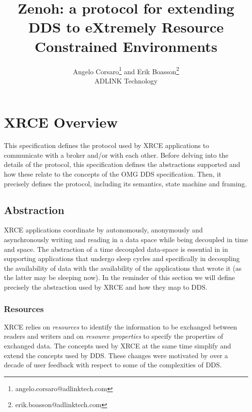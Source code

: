 \documentclass[a4paper,oneside,article]{memoir}
\begin{document}
\title{Zenoh: a protocol for extending DDS to eXtremely Resource Constrained Environments}
\author{Angelo Corsaro\thanks{angelo.corsaro@adlinktech.com} and Erik Boasson\thanks{erik.boasson@adlinktech.com} \\ ADLINK Technology}

\maketitle

\chapter{XRCE Overview}

This specification defines the protocol used by XRCE applications to communicate with a broker
and/or with each other.  Before delving into the details of the protocol, this specification defines
the abstractions supported and how these relate to the concepts of the OMG DDS specification.  Then,
it precisely defines the protocol, including its semantics, state machine and framing.

\section{Abstraction}

XRCE applications coordinate by autonomously, anonymously and asynchronously writing and reading in
a data space while being decoupled in time and space.  The abstraction of a time decoupled
data-space is essential in in supporting applications that undergo sleep cycles and specifically in
decoupling the availability of data with the availability of the applications that wrote it (as the
latter may be sleeping now).  In the reminder of this section we will define precisely the
abstraction used by XRCE and how they map to DDS.

\subsection{Resources}

XRCE relies on \emph{resources} to identify the information to be exchanged between readers and
writers and on \emph{resource properties} to specify the properties of exchanged data.  The concepts
used by XRCE at the same time simplify and extend the concepts used by DDS.  These changes were
motivated by over a decade of user feedback with respect to some of the complexities of DDS.
\end{document}
